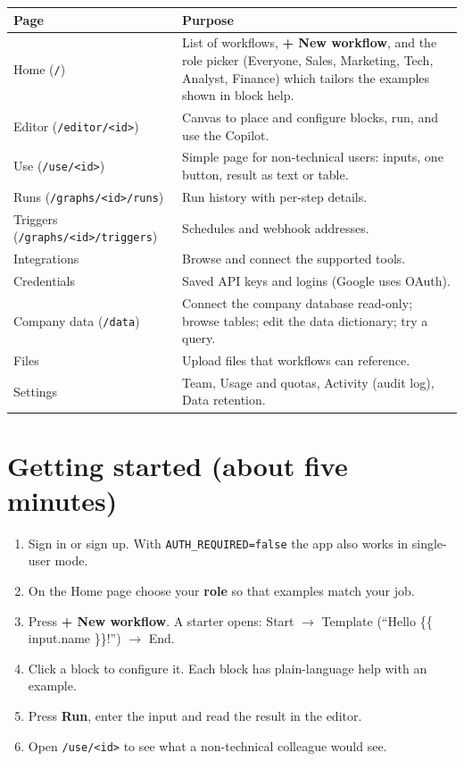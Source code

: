 \documentclass[11pt,a4paper]{article}
\begin{document}
\begin{longtable}{@{}L{4.6cm}L{11cm}@{}}
\toprule
\textbf{Page} & \textbf{Purpose} \\
\midrule
\endhead
Home (\texttt{/}) & List of workflows, \textbf{+ New workflow}, and the role picker (Everyone, Sales, Marketing, Tech, Analyst, Finance) which tailors the examples shown in block help. \\
Editor (\texttt{/editor/<id>}) & Canvas to place and configure blocks, run, and use the Copilot. \\
Use (\texttt{/use/<id>}) & Simple page for non-technical users: inputs, one button, result as text or table. \\
Runs (\texttt{/graphs/<id>/runs}) & Run history with per-step details. \\
Triggers (\texttt{/graphs/<id>/triggers}) & Schedules and webhook addresses. \\
Integrations & Browse and connect the supported tools. \\
Credentials & Saved API keys and logins (Google uses OAuth). \\
Company data (\texttt{/data}) & Connect the company database read-only; browse tables; edit the data dictionary; try a query. \\
Files & Upload files that workflows can reference. \\
Settings & Team, Usage and quotas, Activity (audit log), Data retention. \\
\bottomrule
\end{longtable}

\section{Getting started (about five minutes)}

\begin{enumerate}
  \item Sign in or sign up. With \texttt{AUTH\_REQUIRED=false} the app also works in single-user mode.
  \item On the Home page choose your \textbf{role} so that examples match your job.
  \item Press \textbf{+ New workflow}. A starter opens: Start $\rightarrow$ Template (``Hello \{\{ input.name \}\}!'') $\rightarrow$ End.
  \item Click a block to configure it. Each block has plain-language help with an example.
  \item Press \textbf{Run}, enter the input and read the result in the editor.
  \item Open \texttt{/use/<id>} to see what a non-technical colleague would see.
\end{enumerate}
\end{document}
